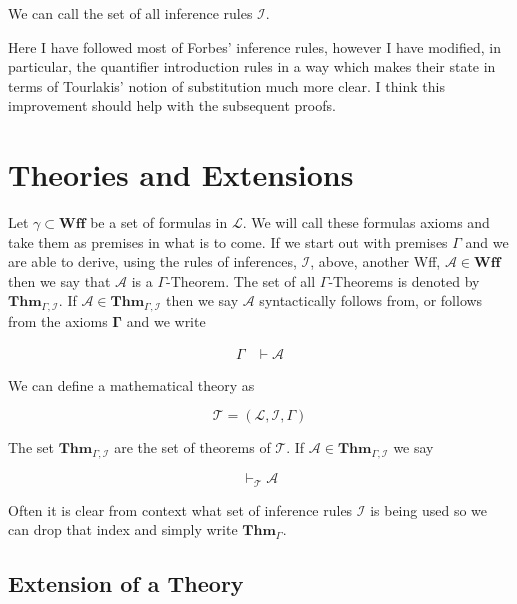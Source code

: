 \documentclass[12pt]{article}
\newcommand{\bv}[1]{\boldsymbol{#1}}
\newcommand{\mc}[1]{\mathcal{#1}}
\newcommand{\bc}[1]{\bv{\mc{#1}}}
\begin{document}
\hrulefill

We can call the set of all inference rules $\bc{I}$.

Here I have followed most of Forbes' inference rules, however I have modified, in particular, the quantifier introduction rules in a way which makes their state in terms of Tourlakis' notion of substitution much more clear. I think this improvement should help with the subsequent proofs.

\section*{Theories and Extensions}

Let $\gamma \subset \mathbf{Wff}$ be a set of formulas in $\mc{L}$. We will call these formulas axioms and take them as premises in what is to come. If we start out with premises $\Gamma$ and we are able to derive, using the rules of inferences, $\bc{I}$, above, another Wff, $\mc{A}\in\textbf{Wff}$ then we say that $\mc{A}$ is a $\Gamma$-Theorem. The set of all $\Gamma$-Theorems is denoted by $\mathbf{Thm}_{\Gamma,\bc{I}}$. If $\mc{A} \in \mathbf{Thm}_{\Gamma,\bc{I}}$ then we say $\mc{A}$ syntactically follows from, or follows from the axioms $\bv{\Gamma}$ and we write

\begin{equation}
\begin{split}
\Gamma &\vdash \mc{A}
\end{split}
\end{equation}


We can define a mathematical theory as

\begin{equation}
\bc{T} = (\bv{\mc{L}}, \bc{I}, \Gamma)
\end{equation}

The set $\mathbf{Thm}_{\Gamma,\bc{I}}$ are the set of theorems of $\bc{T}$. If $\mc{A} \in \textbf{Thm}_{\Gamma,\bc{I}}$ we say

\begin{equation}
\vdash_{\bc{T}} \mc{A}
\end{equation}

Often it is clear from context what set of inference rules $\bc{I}$ is being used so we can drop that index and simply write $\textbf{Thm}_{\Gamma}$.


\subsection*{Extension of a Theory}
\end{document}
